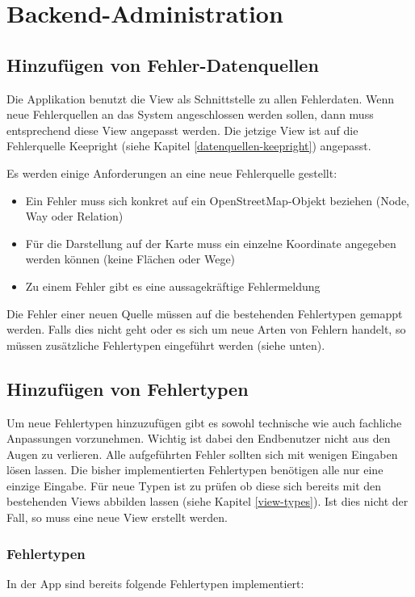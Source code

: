 \chapter{Backend-Administration}
\label{backend-administration}

\section{Hinzufügen von Fehler-Datenquellen}
\label{additional-error-source}
Die Applikation benutzt die View  als Schnittstelle zu allen Fehlerdaten.
Wenn neue Fehlerquellen an das System angeschlossen werden sollen, dann muss entsprechend diese View angepasst werden.
Die jetzige View ist auf die Fehlerquelle Keepright (siehe Kapitel \ref{datenquellen-keepright}) angepasst.

Es werden einige Anforderungen an eine neue Fehlerquelle gestellt:
\begin{itemize}
\item Ein Fehler muss sich konkret auf ein OpenStreetMap-Objekt beziehen (Node, Way oder Relation)
\item Für die Darstellung auf der Karte muss ein einzelne Koordinate angegeben werden können (keine Flächen oder Wege)
\item Zu einem Fehler gibt es eine aussagekräftige Fehlermeldung
\end{itemize}

Die Fehler einer neuen Quelle müssen auf die bestehenden Fehlertypen gemappt werden.
Falls dies nicht geht oder es sich um neue Arten von Fehlern handelt, so müssen zusätzliche Fehlertypen eingeführt werden (siehe unten).

\section{Hinzufügen von Fehlertypen}
\label{additional-error-type}
Um neue Fehlertypen hinzuzufügen gibt es sowohl technische wie auch fachliche Anpassungen vorzunehmen.
Wichtig ist dabei den Endbenutzer nicht aus den Augen zu verlieren.
Alle aufgeführten Fehler sollten sich mit wenigen Eingaben lösen lassen.
Die bisher implementierten Fehlertypen benötigen alle nur eine einzige Eingabe.
Für neue Typen ist zu prüfen ob diese sich bereits mit den bestehenden Views abbilden lassen (siehe Kapitel \ref{view-types}).
Ist dies nicht der Fall, so muss eine neue View erstellt werden.

\subsection{Fehlertypen}
In der App sind bereits folgende Fehlertypen implementiert:

